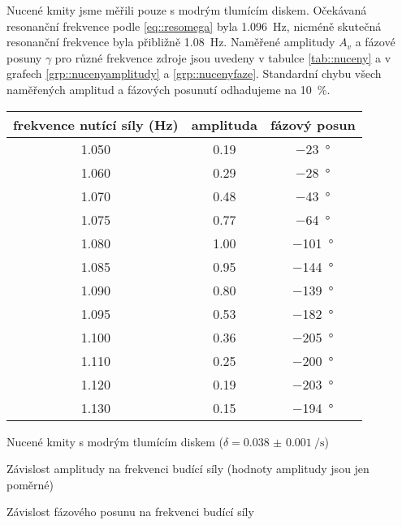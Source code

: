 Nucené kmity jsme měřili pouze s modrým tlumícím diskem.
Očekávaná resonanční frekvence podle \eqref{eq::resomega} byla \SI{1.096}{\hertz}, nicméně skutečná resonanční frekvence byla přibližně \SI{1.08}{\hertz}.
Naměřené amplitudy $A_v$ a fázové posuny $\gamma$ pro různé frekvence zdroje jsou uvedeny v tabulce \ref{tab::nuceny} a v grafech \ref{grp::nucenyamplitudy} a \ref{grp::nucenyfaze}.
Standardní chybu všech naměřených amplitud a fázových posunutí odhadujeme na \SI{10}{\percent}.


\begin{tabulka}[htbp]
\centering
\begin{tabular}{ccc}
frekvence nutící síly (\si{\hertz}) & amplituda & fázový posun \\ \hline
\num{1.050} & \num{0.19} & \SI{-23}{\degree} \\
\num{1.060} & \num{0.29} & \SI{-28}{\degree} \\
\num{1.070} & \num{0.48} & \SI{-43}{\degree} \\
\num{1.075} & \num{0.77} & \SI{-64}{\degree} \\
\num{1.080} & \num{1.00} & \SI{-101}{\degree} \\
\num{1.085} & \num{0.95} & \SI{-144}{\degree} \\
\num{1.090} & \num{0.80} & \SI{-139}{\degree} \\
\num{1.095} & \num{0.53} & \SI{-182}{\degree} \\
\num{1.100} & \num{0.36} & \SI{-205}{\degree} \\
\num{1.110} & \num{0.25} & \SI{-200}{\degree} \\
\num{1.120} & \num{0.19} & \SI{-203}{\degree} \\
\num{1.130} & \num{0.15} & \SI{-194}{\degree} \\
\end{tabular}
\caption{Nucené kmity s modrým tlumícím diskem ($\delta = \SI{0.038(1)}{\per\second}$)}
\label{tab::nuceny}
\end{tabulka}

\begin{graph}[htbp] 
\centering

\caption{Závislost amplitudy na frekvenci budící síly (hodnoty amplitudy jsou jen poměrné)}
\label{grp::nucenyamplitudy}
\end{graph}

\begin{graph}[htbp] 
\centering

\caption{Závislost fázového posunu na frekvenci budící síly}
\label{grp::nucenyfaze}
\end{graph}